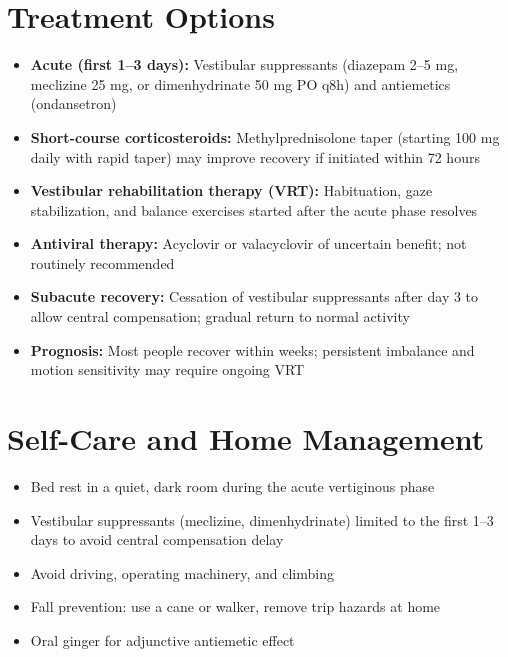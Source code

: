 \section*{Treatment Options}
\begin{itemize}
  \item \textbf{Acute (first 1--3 days):} Vestibular suppressants (diazepam 2--5 mg, meclizine 25 mg, or dimenhydrinate 50 mg PO q8h) and antiemetics (ondansetron)
  \item \textbf{Short-course corticosteroids:} Methylprednisolone taper (starting 100 mg daily with rapid taper) may improve recovery if initiated within 72 hours
  \item \textbf{Vestibular rehabilitation therapy (VRT):} Habituation, gaze stabilization, and balance exercises started after the acute phase resolves
  \item \textbf{Antiviral therapy:} Acyclovir or valacyclovir of uncertain benefit; not routinely recommended
  \item \textbf{Subacute recovery:} Cessation of vestibular suppressants after day 3 to allow central compensation; gradual return to normal activity
  \item \textbf{Prognosis:} Most people recover within weeks; persistent imbalance and motion sensitivity may require ongoing VRT
\end{itemize}

\section*{Self-Care and Home Management}
\begin{itemize}
  \item Bed rest in a quiet, dark room during the acute vertiginous phase
  \item Vestibular suppressants (meclizine, dimenhydrinate) limited to the first 1--3 days to avoid central compensation delay
  \item Avoid driving, operating machinery, and climbing
  \item Fall prevention: use a cane or walker, remove trip hazards at home
  \item Oral ginger for adjunctive antiemetic effect
\end{itemize}


